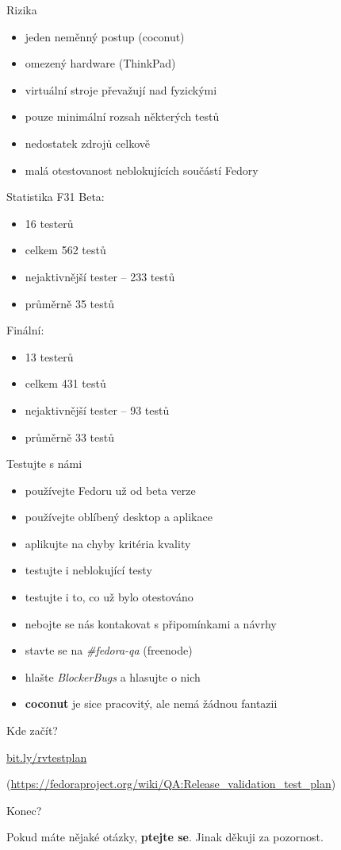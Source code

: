 \documentclass[12pt,aspectratio=169]{beamer}
\begin{document}
\begin{frame}{Rizika}
	
	\begin{itemize}
		\item jeden neměnný postup (coconut)
		\item omezený hardware (ThinkPad)
		\item virtuální stroje převažují nad fyzickými
		\item pouze minimální rozsah některých testů
		\item nedostatek zdrojů celkově
		\item malá otestovanost neblokujících součástí Fedory
	\end{itemize}
\end{frame}

\begin{frame}{Statistika F31}
	Beta:
	\begin{itemize}
		\item 16 testerů
		\item celkem 562 testů
		\item nejaktivnější tester -- 233 testů
		\item průměrně 35 testů
	\end{itemize}
	Finální:
	\begin{itemize}
		\item 13 testerů
		\item celkem 431 testů
		\item nejaktivnější tester -- 93 testů
		\item průměrně 33 testů
	\end{itemize}
\end{frame}

\begin{frame}{Testujte s námi}
		\begin{itemize}
		\item používejte Fedoru už od beta verze
		\item používejte oblíbený desktop a aplikace
		\item aplikujte na chyby kritéria kvality
		\item testujte i neblokující testy
		\item testujte i to, co už bylo otestováno
		\item nebojte se nás kontakovat s připomínkami a návrhy
		\item stavte se na \textit{\#fedora-qa} (freenode)
		\item hlašte \textit{BlockerBugs} a hlasujte o nich
		\item \textbf{coconut} je sice pracovitý, ale nemá žádnou fantazii
	\end{itemize}
\end{frame}

\begin{frame}{Kde začít?}
	
{\Large \url{bit.ly/rvtestplan}}

\vspace{10pt}
	
({\small \url{https://fedoraproject.org/wiki/QA:Release_validation_test_plan}})

\end{frame}

\begin{frame}{Konec?}

Pokud máte nějaké otázky, \textbf{ptejte se}. Jinak děkuji za pozornost.

\end{frame}
\end{document}
